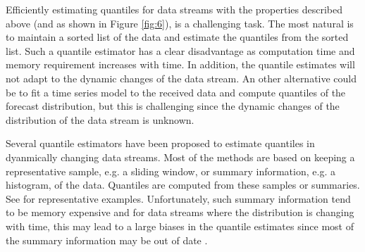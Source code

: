 \documentclass[10pt, a4paper]{article}
\newtheorem{rational for conjecture}{Rational for Conjecture}
\begin{document}
Efficiently estimating quantiles for data streams with the properties described above (and as shown in Figure \ref{fig:6}), is a challenging task. The most natural is to maintain a sorted list of the data and estimate the quantiles from the sorted list. Such a quantile estimator has a clear disadvantage as computation time and memory requirement increases with time. In addition, the quantile estimates will not adapt to the dynamic changes of the data stream. An other alternative could be to fit a time series model to the received data and compute quantiles of the forecast distribution, but this is challenging since the dynamic changes of the distribution of the data stream is unknown.

Several quantile estimators have been proposed to estimate quantiles in dyanmically changing data streams. Most of the methods are based on keeping a representative sample, e.g. a sliding window, or summary information, e.g. a histogram, of the data. Quantiles are computed from these samples or summaries. See \cite{gilbert2002summarize,Arasu2004,gilbert2002fast,datar2002maintaining,lin2004continuously} for representative examples. Unfortunately, such summary information tend to be memory expensive and for data streams where the distribution is changing with time, this may lead to a large biases in the quantile estimates since most of the summary information may be out of date \cite{cao2009incremental}.
\end{document}
